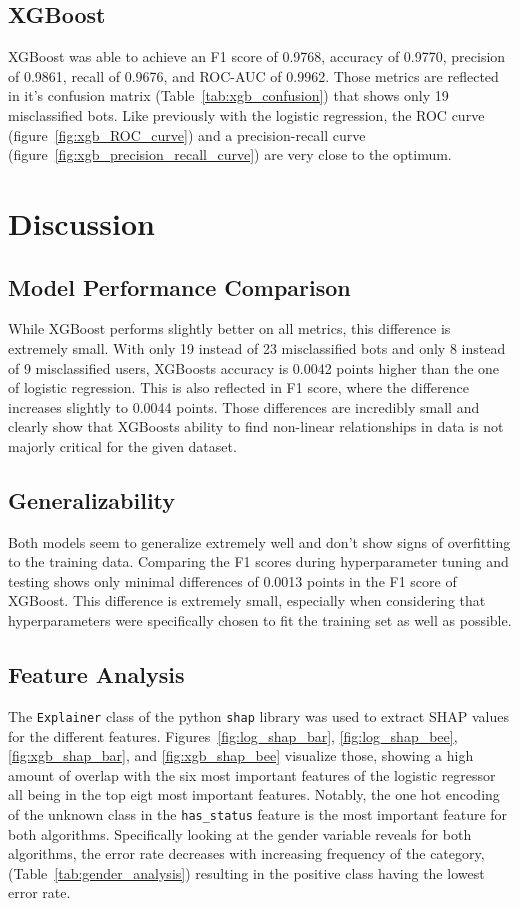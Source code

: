 \documentclass[twocolumn]{article}
\begin{document}
\subsection{XGBoost}
XGBoost was able to achieve an F1 score of 0.9768, accuracy of 0.9770, precision of 0.9861, recall of 0.9676, and ROC-AUC of 0.9962. Those metrics are reflected in it's confusion matrix (Table~\ref{tab:xgb_confusion}) that shows only 19 misclassified bots. Like previously with the logistic regression, the ROC curve (figure~\ref{fig:xgb_ROC_curve}) and a precision-recall curve (figure~\ref{fig:xgb_precision_recall_curve}) are very close to the optimum.

\section{Discussion}

\subsection{Model Performance Comparison}
While XGBoost performs slightly better on all metrics, this difference is extremely small. With only 19 instead of 23 misclassified bots and only 8 instead of 9 misclassified users, XGBoosts accuracy is 0.0042 points higher than the one of logistic regression. This is also reflected in F1 score, where the difference increases slightly to 0.0044 points.
Those differences are incredibly small and clearly show that XGBoosts ability to find non-linear relationships in data is not majorly critical for the given dataset.

\subsection{Generalizability}

Both models seem to generalize extremely well and don't show signs of overfitting to the training data. Comparing the F1 scores during hyperparameter tuning and testing shows only minimal differences of 0.0013 points in the F1 score of XGBoost. This difference is extremely small, especially when considering that hyperparameters were specifically chosen to fit the training set as well as possible.

\subsection{Feature Analysis}

The \texttt{Explainer} class of the python \texttt{shap} library was used to extract SHAP values for the different features. Figures~\ref{fig:log_shap_bar}, \ref{fig:log_shap_bee}, \ref{fig:xgb_shap_bar}, and \ref{fig:xgb_shap_bee} visualize those, showing a high amount of overlap with the six most important features of the logistic regressor all being in the top eigt most important features. Notably, the one hot encoding of the unknown class in the \texttt{has\_status} feature is the most important feature for both algorithms. 
Specifically looking at the gender variable reveals for both algorithms, the error rate decreases with increasing frequency of the category, (Table~\ref{tab:gender_analysis}) resulting in the positive class having the lowest error rate.
\end{document}
